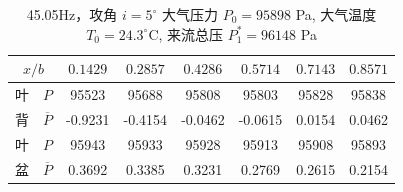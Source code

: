 \begin{table}[H]
  \centering
  \caption[45.05Hz 攻角 $i=5^\circ$ 实验数据]{45.05Hz，攻角 $i=5^\circ$ 大气压力 $P_0=95898$ Pa, 大气温度 $T_0=24.3^\circ\text{C}$, 来流总压 $P_1^*=96148$ Pa}
  \label{tab:exp4_45.05Hz_5}
  \renewcommand{\arraystretch}{1.2}
  \begin{tabular}{cccccccc}
    \toprule
    \multicolumn{2}{c}{$x/b$} & $0.1429$ & $0.2857$ & $0.4286$ & $0.5714$ & $0.7143$ & $0.8571$ \\
    \midrule
    叶 & $P$ & 95523 & 95688 & 95808 & 95803 & 95828 & 95838 \\
    背 & $\overline{P}$ & -0.9231 & -0.4154 & -0.0462 & -0.0615 & 0.0154 & 0.0462 \\
    \midrule
    叶 & $P$ & 95943 & 95933 & 95928 & 95913 & 95908 & 95893 \\
    盆 & $\overline{P}$ & 0.3692 & 0.3385 & 0.3231 & 0.2769 & 0.2615 & 0.2154 \\
    \bottomrule
  \end{tabular}
\end{table}